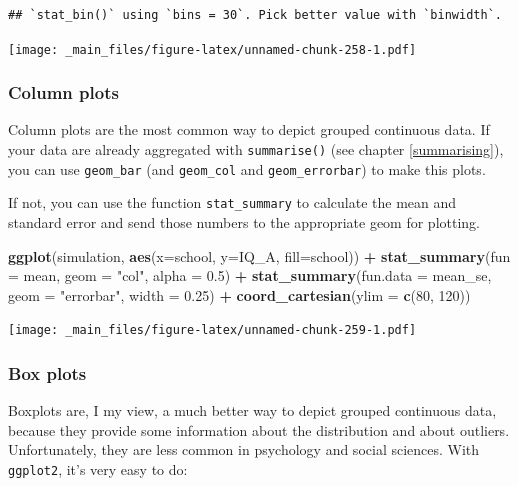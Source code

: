\documentclass[
]{scrartcl}
\newenvironment{Shaded}{\begin{snugshade}}{\end{snugshade}}
\newcommand{\DataTypeTok}[1]{\textcolor[rgb]{0.13,0.29,0.53}{#1}}
\newcommand{\DecValTok}[1]{\textcolor[rgb]{0.00,0.00,0.81}{#1}}
\newcommand{\FloatTok}[1]{\textcolor[rgb]{0.00,0.00,0.81}{#1}}
\newcommand{\KeywordTok}[1]{\textcolor[rgb]{0.13,0.29,0.53}{\textbf{#1}}}
\newcommand{\NormalTok}[1]{#1}
\newcommand{\OperatorTok}[1]{\textcolor[rgb]{0.81,0.36,0.00}{\textbf{#1}}}
\newcommand{\StringTok}[1]{\textcolor[rgb]{0.31,0.60,0.02}{#1}}
\begin{document}
\begin{verbatim}
## `stat_bin()` using `bins = 30`. Pick better value with `binwidth`.
\end{verbatim}

\texttt{[image: \_main\_files/figure-latex/unnamed-chunk-258-1.pdf]}

\hypertarget{column-plots}{%
\subsubsection{Column plots}\label{column-plots}}

Column plots are the most common way to depict grouped continuous data. If your data are already aggregated with \texttt{summarise()} (see chapter \ref{summarising}), you can use \texttt{geom\_bar} (and \texttt{geom\_col} and \texttt{geom\_errorbar}) to make this plots.

If not, you can use the function \texttt{stat\_summary} to calculate the mean and standard error and send those numbers to the appropriate geom for plotting.

\begin{Shaded}
\begin{Highlighting}[]
\KeywordTok{ggplot}\NormalTok{(simulation, }\KeywordTok{aes}\NormalTok{(}\DataTypeTok{x=}\NormalTok{school, }\DataTypeTok{y=}\NormalTok{IQ\_A, }\DataTypeTok{fill=}\NormalTok{school)) }\OperatorTok{+}
\StringTok{  }\KeywordTok{stat\_summary}\NormalTok{(}\DataTypeTok{fun =}\NormalTok{ mean, }\DataTypeTok{geom =} \StringTok{"col"}\NormalTok{, }\DataTypeTok{alpha =} \FloatTok{0.5}\NormalTok{) }\OperatorTok{+}
\StringTok{  }\KeywordTok{stat\_summary}\NormalTok{(}\DataTypeTok{fun.data =}\NormalTok{ mean\_se, }\DataTypeTok{geom =} \StringTok{"errorbar"}\NormalTok{, }\DataTypeTok{width =} \FloatTok{0.25}\NormalTok{) }\OperatorTok{+}
\StringTok{  }\KeywordTok{coord\_cartesian}\NormalTok{(}\DataTypeTok{ylim =} \KeywordTok{c}\NormalTok{(}\DecValTok{80}\NormalTok{, }\DecValTok{120}\NormalTok{))}
\end{Highlighting}
\end{Shaded}

\texttt{[image: \_main\_files/figure-latex/unnamed-chunk-259-1.pdf]}

\hypertarget{box-plots}{%
\subsubsection{Box plots}\label{box-plots}}

Boxplots are, I my view, a much better way to depict grouped continuous data, because they provide some information about the distribution and about outliers. Unfortunately, they are less common in psychology and social sciences. With \texttt{ggplot2}, it's very easy to do:
\end{document}

